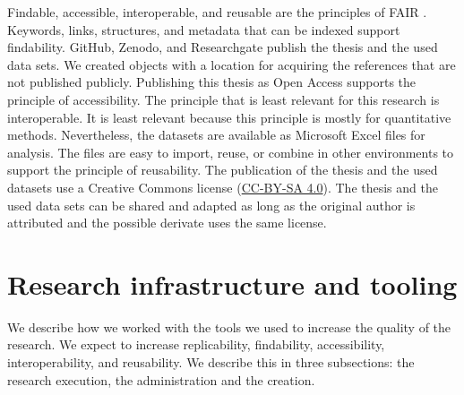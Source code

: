Findable, accessible, interoperable, and reusable are the principles of FAIR \parencite{Wilkinson2016}. Keywords, links, structures, and metadata that can be indexed support findability. GitHub, Zenodo, and Researchgate publish the thesis and the used data sets. We created objects with a location for acquiring the references that are not published publicly. Publishing this thesis as Open Access supports the principle of accessibility. The principle that is least relevant for this research is interoperable. It is least relevant because this principle is mostly for quantitative methods. Nevertheless, the datasets are available as Microsoft Excel files for analysis. The files are easy to import, reuse, or combine in other environments to support the principle of reusability. The publication of the thesis and the used datasets use a Creative Commons license (\href{https://creativecommons.org/licenses/by-sa/4.0/}{CC-BY-SA 4.0}). The thesis and the used data sets can be shared and adapted as long as the original author is attributed and the possible derivate uses the same license.

\section{Research infrastructure and tooling}
\label{sub:researchinfraandtooling}
We describe how we worked with the tools we used to increase the quality of the research. We expect to increase replicability, findability, accessibility, interoperability, and reusability. We describe this in three subsections: the research execution, the administration and the creation.
